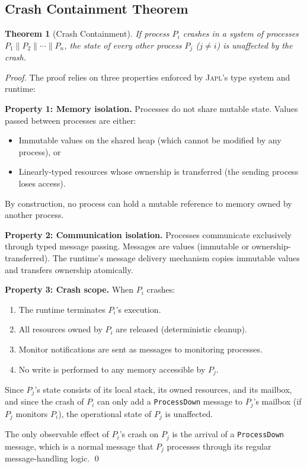 \documentclass[11pt,twocolumn]{article}
\newtheorem{theorem}{Theorem}[section]
\newcommand{\japl}{\textsc{Japl}}
\begin{document}
\subsection{Crash Containment Theorem}

\begin{theorem}[Crash Containment]\label{thm:crash-containment}
If process $P_i$ crashes in a system of processes $P_1 \parallel P_2 \parallel \cdots \parallel P_n$, the state of every other process $P_j$ ($j \neq i$) is unaffected by the crash.
\end{theorem}

\begin{proof}
The proof relies on three properties enforced by \japl{}'s type system and runtime:

\textbf{Property 1: Memory isolation.} Processes do not share mutable state. Values passed between processes are either:
\begin{itemize}
  \item Immutable values on the shared heap (which cannot be modified by any process), or
  \item Linearly-typed resources whose ownership is transferred (the sending process loses access).
\end{itemize}

By construction, no process can hold a mutable reference to memory owned by another process.

\textbf{Property 2: Communication isolation.} Processes communicate exclusively through typed message passing. Messages are values (immutable or ownership-transferred). The runtime's message delivery mechanism copies immutable values and transfers ownership atomically.

\textbf{Property 3: Crash scope.} When $P_i$ crashes:
\begin{enumerate}
  \item The runtime terminates $P_i$'s execution.
  \item All resources owned by $P_i$ are released (deterministic cleanup).
  \item Monitor notifications are sent as messages to monitoring processes.
  \item No write is performed to any memory accessible by $P_j$.
\end{enumerate}

Since $P_j$'s state consists of its local stack, its owned resources, and its mailbox, and since the crash of $P_i$ can only add a \texttt{ProcessDown} message to $P_j$'s mailbox (if $P_j$ monitors $P_i$), the operational state of $P_j$ is unaffected.

The only observable effect of $P_i$'s crash on $P_j$ is the arrival of a \texttt{ProcessDown} message, which is a normal message that $P_j$ processes through its regular message-handling logic. \qed
\end{proof}
\end{document}
